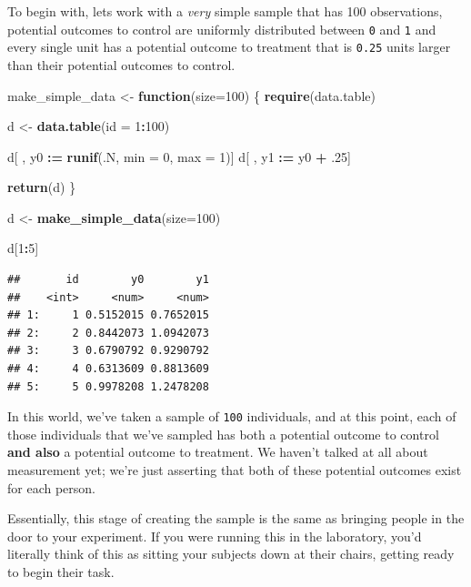 \documentclass[
]{article}
\newenvironment{Shaded}{\begin{snugshade}}{\end{snugshade}}
\newcommand{\AttributeTok}[1]{\textcolor[rgb]{0.13,0.29,0.53}{#1}}
\newcommand{\ControlFlowTok}[1]{\textcolor[rgb]{0.13,0.29,0.53}{\textbf{#1}}}
\newcommand{\DecValTok}[1]{\textcolor[rgb]{0.00,0.00,0.81}{#1}}
\newcommand{\FunctionTok}[1]{\textcolor[rgb]{0.13,0.29,0.53}{\textbf{#1}}}
\newcommand{\NormalTok}[1]{#1}
\newcommand{\OtherTok}[1]{\textcolor[rgb]{0.56,0.35,0.01}{#1}}
\newcommand{\SpecialCharTok}[1]{\textcolor[rgb]{0.81,0.36,0.00}{\textbf{#1}}}
\theoremstyle{definition}
\theoremstyle{definition}
\theoremstyle{definition}
\theoremstyle{definition}
\theoremstyle{remark}
\begin{document}
To begin with, lets work with a \emph{very} simple sample that has 100 observations, potential outcomes to control are uniformly distributed between \texttt{0} and \texttt{1} and every single unit has a potential outcome to treatment that is \texttt{0.25} units larger than their potential outcomes to control.

\begin{Shaded}
\begin{Highlighting}[]
\NormalTok{make\_simple\_data }\OtherTok{\textless{}{-}} \ControlFlowTok{function}\NormalTok{(}\AttributeTok{size=}\DecValTok{100}\NormalTok{) \{ }
  \FunctionTok{require}\NormalTok{(data.table) }
  
\NormalTok{  d }\OtherTok{\textless{}{-}} \FunctionTok{data.table}\NormalTok{(}\AttributeTok{id =} \DecValTok{1}\SpecialCharTok{:}\DecValTok{100}\NormalTok{)  }
  
\NormalTok{  d[ , y0 }\SpecialCharTok{:=} \FunctionTok{runif}\NormalTok{(.N, }\AttributeTok{min =} \DecValTok{0}\NormalTok{, }\AttributeTok{max =} \DecValTok{1}\NormalTok{)]}
\NormalTok{  d[ , y1 }\SpecialCharTok{:=}\NormalTok{ y0 }\SpecialCharTok{+}\NormalTok{ .}\DecValTok{25}\NormalTok{]}
  
  \FunctionTok{return}\NormalTok{(d)}
\NormalTok{  \}}

\NormalTok{d }\OtherTok{\textless{}{-}} \FunctionTok{make\_simple\_data}\NormalTok{(}\AttributeTok{size=}\DecValTok{100}\NormalTok{)}

\NormalTok{d[}\DecValTok{1}\SpecialCharTok{:}\DecValTok{5}\NormalTok{]}
\end{Highlighting}
\end{Shaded}

\begin{verbatim}
##       id        y0        y1
##    <int>     <num>     <num>
## 1:     1 0.5152015 0.7652015
## 2:     2 0.8442073 1.0942073
## 3:     3 0.6790792 0.9290792
## 4:     4 0.6313609 0.8813609
## 5:     5 0.9978208 1.2478208
\end{verbatim}

In this world, we've taken a sample of \texttt{100} individuals, and at this point, each of those individuals that we've sampled has both a potential outcome to control \textbf{and also} a potential outcome to treatment. We haven't talked at all about measurement yet; we're just asserting that both of these potential outcomes exist for each person.

Essentially, this stage of creating the sample is the same as bringing people in the door to your experiment. If you were running this in the laboratory, you'd literally think of this as sitting your subjects down at their chairs, getting ready to begin their task.
\end{document}
